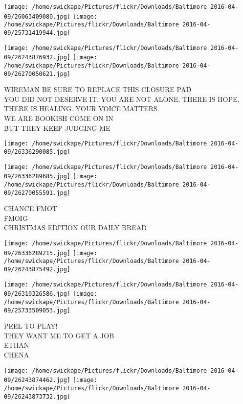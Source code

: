 \documentclass[10pt,letterpaper]{article}
\begin{document}
\texttt{[image: /home/swickape/Pictures/flickr/Downloads/Baltimore 2016-04-09/26063409080.jpg]}
\texttt{[image: /home/swickape/Pictures/flickr/Downloads/Baltimore 2016-04-09/25731419944.jpg]}

\texttt{[image: /home/swickape/Pictures/flickr/Downloads/Baltimore 2016-04-09/26243876932.jpg]}
\texttt{[image: /home/swickape/Pictures/flickr/Downloads/Baltimore 2016-04-09/26270050621.jpg]}

WIREMAN BE SURE TO REPLACE THIS CLOSURE PAD\\
YOU DID NOT DESERVE IT. YOU ARE NOT ALONE. THERE IS HOPE. THERE IS HEALING. YOUR VOICE MATTERS.\\
WE ARE BOOKISH COME ON IN\\
BUT THEY KEEP JUDGING ME\\
\pagebreak

\texttt{[image: /home/swickape/Pictures/flickr/Downloads/Baltimore 2016-04-09/26336290085.jpg]}

\vspace{0.25in}
\texttt{[image: /home/swickape/Pictures/flickr/Downloads/Baltimore 2016-04-09/26336289685.jpg]}
\texttt{[image: /home/swickape/Pictures/flickr/Downloads/Baltimore 2016-04-09/26270055591.jpg]}

CHANCE FMOT\\
FMOIG\\
CHRISTMAS EDITION OUR DAILY BREAD\\
\pagebreak

\texttt{[image: /home/swickape/Pictures/flickr/Downloads/Baltimore 2016-04-09/26336289215.jpg]}
\texttt{[image: /home/swickape/Pictures/flickr/Downloads/Baltimore 2016-04-09/26243875492.jpg]}

\texttt{[image: /home/swickape/Pictures/flickr/Downloads/Baltimore 2016-04-09/26310326586.jpg]}
\texttt{[image: /home/swickape/Pictures/flickr/Downloads/Baltimore 2016-04-09/25733509053.jpg]}

PEEL TO PLAY!\\
THEY WANT ME TO GET A JOB\\
ETHAN\\
CHENA\\
\pagebreak

\texttt{[image: /home/swickape/Pictures/flickr/Downloads/Baltimore 2016-04-09/26243874462.jpg]}
\texttt{[image: /home/swickape/Pictures/flickr/Downloads/Baltimore 2016-04-09/26243873732.jpg]}
\end{document}

